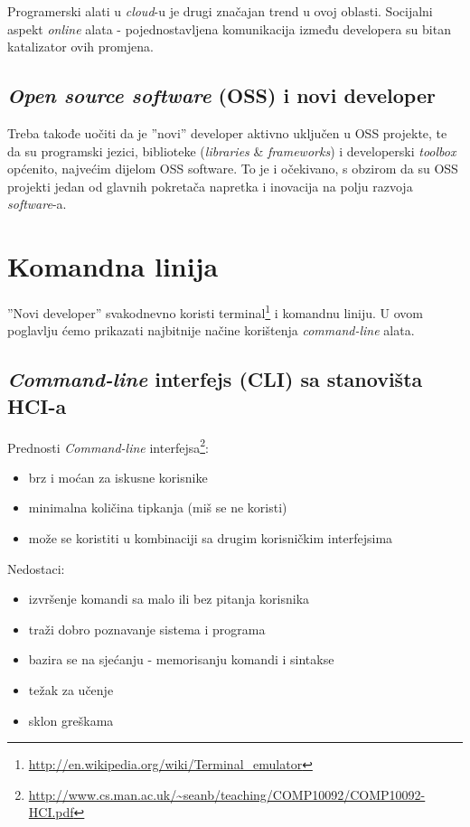 \documentclass[times, utf8, seminar]{fit}
\begin{document}
Programerski alati u \emph{cloud}-u je drugi značajan trend u ovoj oblasti. Socijalni aspekt \emph{online} alata - pojednostavljena komunikacija između developera su bitan katalizator ovih promjena.

\section{\emph{Open source software} (OSS) i novi developer}

Treba takođe uočiti da je ''novi'' developer aktivno uključen u OSS projekte, te da su programski jezici, biblioteke (\emph{libraries} \& \emph{frameworks}) i developerski \emph{toolbox} općenito, najvećim dijelom OSS software. To je i očekivano, s obzirom da su OSS projekti jedan od glavnih pokretača napretka i inovacija na polju razvoja \emph{software}-a. 
 
\chapter{Komandna linija}

''Novi developer'' svakodnevno koristi terminal\footnote{\url{http://en.wikipedia.org/wiki/Terminal_emulator}} i komandnu liniju. U ovom poglavlju ćemo prikazati najbitnije načine korištenja \emph{command-line} alata.

\section{\emph{Command-line} interfejs (CLI) sa stanovišta HCI-a}
\label{sec:cli_hci}
Prednosti \emph{Command-line} interfejsa\footnote{\url{http://www.cs.man.ac.uk/~seanb/teaching/COMP10092/COMP10092-HCI.pdf}}:
\begin{itemize}
 \item brz i moćan za iskusne korisnike
 \item minimalna količina tipkanja (miš se ne koristi)
 \item može se koristiti u kombinaciji sa drugim korisničkim interfejsima
\end{itemize}

Nedostaci:
\begin{itemize}
\item izvršenje komandi sa malo ili bez pitanja korisnika
\item traži dobro poznavanje sistema i programa
\item bazira se na sjećanju - memorisanju komandi i sintakse
\item težak za učenje
\item sklon greškama
\end{itemize}
\end{document}
